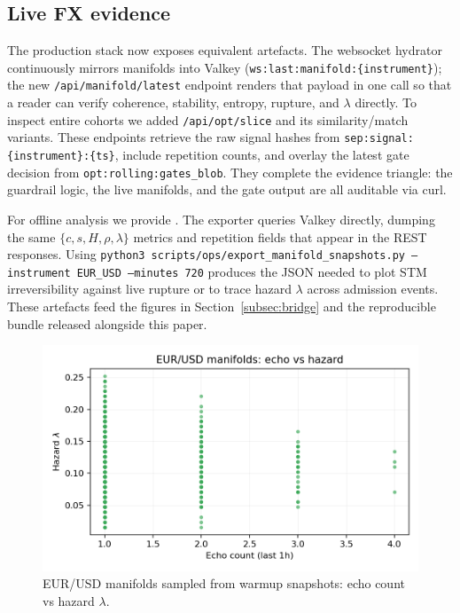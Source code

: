 \documentclass[11pt]{article}
\begin{document}
\subsection{Live FX evidence}
\label{subsec:live-evidence}
The production stack now exposes equivalent artefacts. The websocket hydrator
continuously mirrors manifolds into Valkey
(\texttt{ws:last:manifold:\{instrument\}}); the new
\texttt{/api/manifold/latest} endpoint renders that payload in one call so that a
reader can verify coherence, stability, entropy, rupture, and $\lambda$ directly.
To inspect entire cohorts we added \texttt{/api/opt/slice} and its similarity/match
variants. These endpoints retrieve the raw signal hashes from
\texttt{sep:signal:\{instrument\}:\{ts\}}, include repetition counts, and overlay the
latest gate decision from \texttt{opt:rolling:gates\_blob}. They complete the
evidence triangle: the guardrail logic, the live manifolds, and the gate output
are all auditable via curl.

For offline analysis we provide
. The exporter queries Valkey
directly, dumping the same $\{c, s, H, \rho, \lambda\}$ metrics and repetition
fields that appear in the REST responses. Using
\texttt{python3 scripts/ops/export\_manifold\_snapshots.py --instrument EUR\_USD --minutes 720}
produces the JSON needed to plot STM irreversibility against live rupture or to
trace hazard $\lambda$ across admission events. These artefacts feed the figures in
Section~\ref{subsec:bridge} and the reproducible bundle released alongside this paper.

\begin{figure}[h]
  \centering
  \includegraphics[width=0.72\linewidth]{../figures/fig2_spt_echo_vs_lambda.png}
  \caption{EUR/USD manifolds sampled from warmup snapshots: echo count vs hazard $\lambda$.}
  \label{fig:spt-echo-lambda}
\end{figure}
\end{document}
